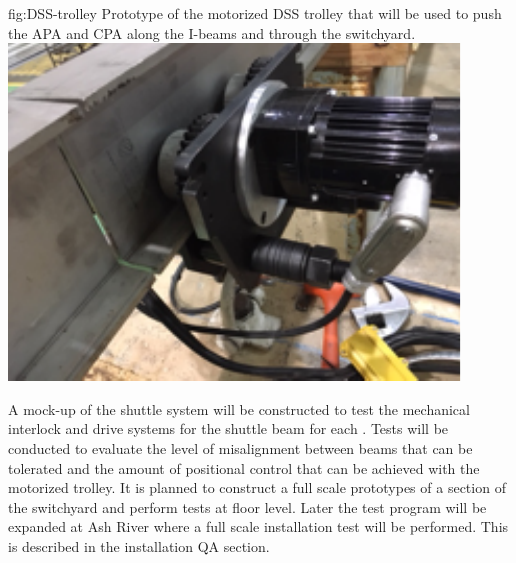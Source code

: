 \begin{dunefigure}{fig:DSS-trolley}
  {Prototype of the motorized DSS trolley that will be used to push the APA and CPA along the I-beams and through the switchyard.}
\includegraphics[width=.49\textwidth]{graphics/DSS-trolley.pdf}
\end{dunefigure}



A mock-up of the shuttle system will be constructed to test the
mechanical interlock and drive systems for the shuttle beam
for each .  Tests will be conducted to evaluate the level of
misalignment between beams that can be tolerated and the amount of
positional control that can be achieved with the motorized trolley. It is planned to construct a full scale prototypes of a section of the  switchyard and perform tests at floor level. Later the test program will be expanded at Ash River where a full scale installation test will be performed. This is described in the installation QA section.
